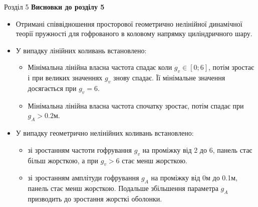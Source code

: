 \documentclass[8pt]{beamer}
\numberwithin{figure}{section}
\numberwithin{equation}{section}
\numberwithin{table}{section}
\begin{document}
\begin{frame}{Розділ 5}
\textbf{Висновки до розділу 5}\\
\vspace{1em}
\begin{itemize}
\item Отримані співвідношення просторової геометрично нелінійної динамічної теорії пружності для гофрованого в коловому напрямку циліндричного шару.
\item У випадку лінійних коливань встановлено:
\begin{itemize}
     \item Мінімальна лінійна власна частота спадає коли $g_v \in [0;6] $, потім зростає і при великих значеннях $g_v$ знову спадає. Її мінімальне значення досягається при $g_v = 6$. 
     \item Мінімальна лінійна власна частота спочатку зростає, потім спадає при $g_A > 0.2$м.
   \end{itemize}
\item У випадку геометрично нелінійних коливань встановлено:
\begin{itemize}
     \item зі зростанням частоти гофрування $g_v$ на проміжку від 2 до 6, панель стає більш жорсткою, а при $g_v > 6$ стає менш жорсткою. 
     \item зі зростанням амплітуди гофрування $g_A$ на проміжку від 0м до 0.1м, панель стає менш жорсткою. Подальше збільшення параметра $g_A$ призводить до зростання жорсткі оболонки.
   \end{itemize}

\end{itemize}

\end{frame}
\end{document}
